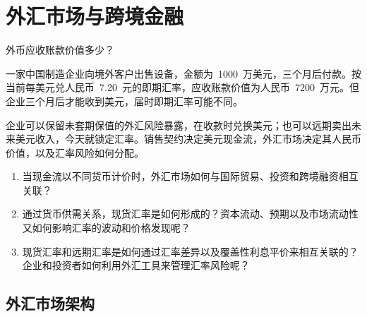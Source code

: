 \chapter{外汇市场与跨境金融}
\label{chap:Foreign_Exchange_Markets_and_Cross_Border_Finance}

\begin{openingcase}{外币应收账款价值多少？}

一家中国制造企业向境外客户出售设备，金额为~1000~万美元，三个月后付款。按当前每美元兑人民币~7.20~元的即期汇率，应收账款价值为人民币~7200~万元。但企业三个月后才能收到美元，届时即期汇率可能不同。

企业可以保留未套期保值的外汇风险暴露，在收款时兑换美元；也可以远期卖出未来美元收入，今天就锁定汇率。销售契约决定美元现金流，外汇市场决定其人民币价值，以及汇率风险如何分配。

\end{openingcase}

\begin{tcolorbox}[
  enhanced,
  colback=FinanceBlue!6,
  colframe=FinanceBlue,
  boxrule=0.6pt,
  sharp corners,
  left=8pt,
  right=8pt,
  top=7pt,
  bottom=7pt,
  before skip=1em,
  after skip=1.6em,
  title=\textbf{核心问题},
  coltitle=white,
  colbacktitle=FinanceBlue,
  fonttitle=\bfseries,
  attach boxed title to top left={xshift=6pt,yshift=-2mm},
  boxed title style={
    boxrule=0pt,
    sharp corners,
    left=5pt,
    right=5pt,
    top=2pt,
    bottom=2pt
  }
]
\begin{enumerate}[
  leftmargin=*,
  label=\textcolor{FinanceBlue}{\textbf{\arabic*.}},
  itemsep=0.55em,
  topsep=0.2em
]

\item 当现金流以不同货币计价时，外汇市场如何与国际贸易、投资和跨境融资相互关联？

\item 通过货币供需关系，现货汇率是如何形成的？资本流动、预期以及市场流动性又如何影响汇率的波动和价格发现呢？

\item 现货汇率和远期汇率是如何通过汇率差异以及覆盖性利息平价来相互关联的？企业和投资者如何利用外汇工具来管理汇率风险呢？

\end{enumerate}

\end{tcolorbox}

\section{外汇市场架构}

